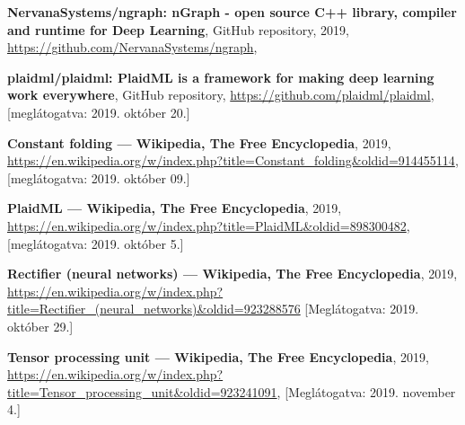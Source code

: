 \begin{thebibliography}{9}
	\textbf{NervanaSystems/ngraph: nGraph - open source C++ library, compiler and runtime for Deep Learning},
	GitHub repository,
	2019,
	\newline\url{https://github.com/NervanaSystems/ngraph},

	\textbf{plaidml/plaidml: PlaidML is a framework for making deep learning work everywhere},
	GitHub repository,
	\newline\url{https://github.com/plaidml/plaidml},
	[meglátogatva: 2019. október 20.]
	
	
	\textbf{Constant folding --- {Wikipedia}{,} The Free Encyclopedia},
	2019,
	\newline\url{https://en.wikipedia.org/w/index.php?title=Constant_folding&oldid=914455114},
	[meglátogatva: 2019. október 09.]
	
	\textbf{PlaidML --- {Wikipedia}{,} The Free Encyclopedia},
	2019,
	\newline\url{https://en.wikipedia.org/w/index.php?title=PlaidML&oldid=898300482},
	[meglátogatva: 2019. október 5.]
	
	\textbf{Rectifier (neural networks) --- {Wikipedia}{,} The Free Encyclopedia},
	2019,
	\newline\url{ https://en.wikipedia.org/w/index.php?title=Rectifier_(neural_networks)&oldid=923288576}
	[Meglátogatva: 2019. október 29.]
	
	\textbf{Tensor processing unit --- {Wikipedia}{,} The Free Encyclopedia},
	2019,
	\newline\url{https://en.wikipedia.org/w/index.php?title=Tensor_processing_unit&oldid=923241091},
	[Meglátogatva: 2019. november 4.]
	
\end{thebibliography}